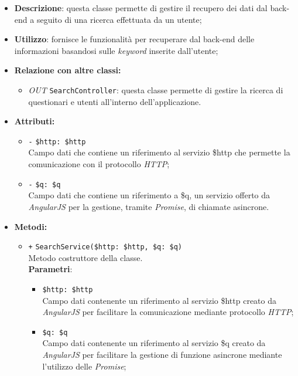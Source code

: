 \begin{itemize}
	\item \textbf{Descrizione}: questa classe permette di gestire il recupero dei dati dal back-end a seguito di una ricerca effettuata da un utente;
	\item \textbf{Utilizzo}: fornisce le funzionalità per recuperare dal back-end delle informazioni basandosi sulle \textit{keyword} inserite dall'utente;
	\item \textbf{Relazione con altre classi:}
	\begin{itemize}
		\item \textit{OUT} \texttt{SearchController}: questa classe permette di gestire la ricerca di questionari e utenti all'interno dell'applicazione.
	\end{itemize}
	\item \textbf{Attributi:}
	\begin{itemize}
		\item \texttt{-} \texttt{\$http: \$http} \\ Campo dati che contiene un riferimento al servizio \$http che permette la comunicazione con il protocollo \textit{HTTP};
		\item \texttt{-} \texttt{\$q: \$q} \\ Campo dati che contiene un riferimento a \$q, un servizio offerto da \textit{AngularJS} per la gestione, tramite \textit{Promise}, di chiamate asincrone. 
	\end{itemize}
	\item \textbf{Metodi:}
	\begin{itemize}
		\item \texttt{+} \texttt{SearchService(\$http: \$http, \$q: \$q)} \\ Metodo costruttore della classe. \\
		\textbf{Parametri}:
		\begin{itemize}
			\item \texttt{\$http: \$http} \\ Campo dati contenente un riferimento al servizio \$http creato da \textit{AngularJS} per facilitare la comunicazione mediante protocollo \textit{HTTP};
			\item \texttt{\$q: \$q} \\ Campo dati contenente un riferimento al servizio \$q creato da \textit{AngularJS} per facilitare la gestione di funzione asincrone mediante l’utilizzo delle \textit{Promise};
		\end{itemize}

\end{itemize}
\end{itemize}
